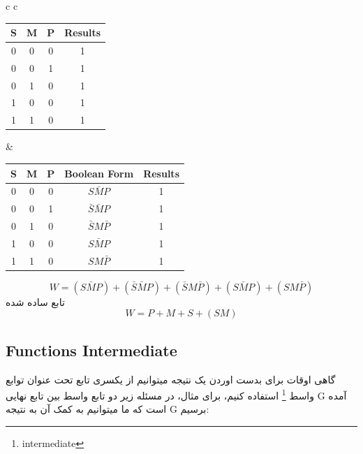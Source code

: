 \documentclass[pt, a5paper]{article}
\begin{document}
\center
\begin{LTR}
	\begin{tabular}{ c c }
		\begin{tabular}{ c c c | c}
			S & M & P & Results\\
			\hline
			0 & 0 & 0 & 1\\
			0 & 0 & 1 & 1\\
			0 & 1 & 0 & 1\\
			1 & 0 & 0 & 1\\
			1 & 1 & 0 & 1\\
		\end{tabular} & 
			\begin{tabular}{ c c c | c | c}
		S & M & P & Boolean Form & Results\\
		\hline
		0 & 0 & 0 & $\bar{S M P}$ & 1\\
		0 & 0 & 1 & $\bar{S} \bar{M} P$ & 1\\
		0 & 1 & 0 & $\bar{S} M \bar{P}$ & 1\\
		1 & 0 & 0 & $S \bar{M} P$& 1\\
		1 & 1 & 0 & $S M \bar{P}$& 1\\
	\end{tabular}
	\end{tabular}
\end{LTR}

\raggedleft
\justifying

\begin{equation}
 W= (\bar{S M P}) + (\bar{S} \bar{M} P) + (\bar{S} M \bar{P}) + (S \bar{M} P) +  (S M \bar{P})
\end{equation}
تابع ساده شده\\
\begin{equation}
 W= P + M + S + (SM)
\end{equation}


\newpage

\raggedleft
\justifying
\subsection{Functions Intermediate}
گاهی اوقات برای بدست اوردن یک نتیجه میتوانیم از یکسری تابع تحت عنوان توابع واسط
\footnote{intermediate}
استفاده کنیم، برای مثال، در مسئله زیر دو تابع واسط بین تابع نهایی G آمده است که ما میتوانیم به کمک آن به نتیجه G برسیم:\\
\end{document}
